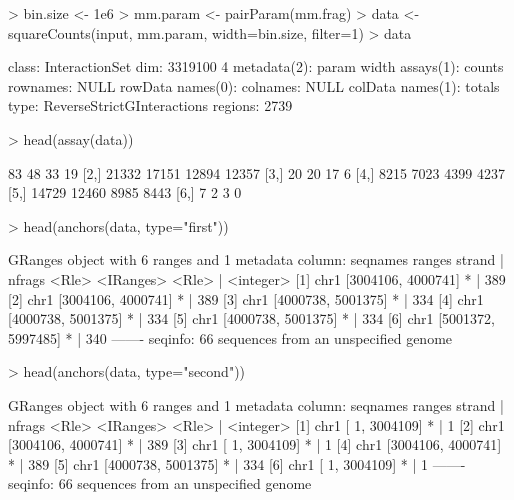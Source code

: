 \documentclass[12pt]{report}
\renewenvironment{Schunk}{\vspace{0pt}}{\vspace{0pt}}
\begin{document}
\begin{Schunk}
\begin{Sinput}
> bin.size <- 1e6
> mm.param <- pairParam(mm.frag)
> data <- squareCounts(input, mm.param, width=bin.size, filter=1)
> data
\end{Sinput}
\begin{Soutput}
class: InteractionSet 
dim: 3319100 4 
metadata(2): param width
assays(1): counts
rownames: NULL
rowData names(0):
colnames: NULL
colData names(1): totals
type: ReverseStrictGInteractions
regions: 2739
\end{Soutput}
\begin{Sinput}
> head(assay(data))
\end{Sinput}
\begin{Soutput}
      [,1]  [,2]  [,3]  [,4]
[1,]    83    48    33    19
[2,] 21332 17151 12894 12357
[3,]    20    20    17     6
[4,]  8215  7023  4399  4237
[5,] 14729 12460  8985  8443
[6,]     7     2     3     0
\end{Soutput}
\begin{Sinput}
> head(anchors(data, type="first"))
\end{Sinput}
\begin{Soutput}
GRanges object with 6 ranges and 1 metadata column:
      seqnames             ranges strand |    nfrags
         <Rle>          <IRanges>  <Rle> | <integer>
  [1]     chr1 [3004106, 4000741]      * |       389
  [2]     chr1 [3004106, 4000741]      * |       389
  [3]     chr1 [4000738, 5001375]      * |       334
  [4]     chr1 [4000738, 5001375]      * |       334
  [5]     chr1 [4000738, 5001375]      * |       334
  [6]     chr1 [5001372, 5997485]      * |       340
  -------
  seqinfo: 66 sequences from an unspecified genome
\end{Soutput}
\begin{Sinput}
> head(anchors(data, type="second"))
\end{Sinput}
\begin{Soutput}
GRanges object with 6 ranges and 1 metadata column:
      seqnames             ranges strand |    nfrags
         <Rle>          <IRanges>  <Rle> | <integer>
  [1]     chr1 [      1, 3004109]      * |         1
  [2]     chr1 [3004106, 4000741]      * |       389
  [3]     chr1 [      1, 3004109]      * |         1
  [4]     chr1 [3004106, 4000741]      * |       389
  [5]     chr1 [4000738, 5001375]      * |       334
  [6]     chr1 [      1, 3004109]      * |         1
  -------
  seqinfo: 66 sequences from an unspecified genome
\end{Soutput}
\end{Schunk}
\end{document}
